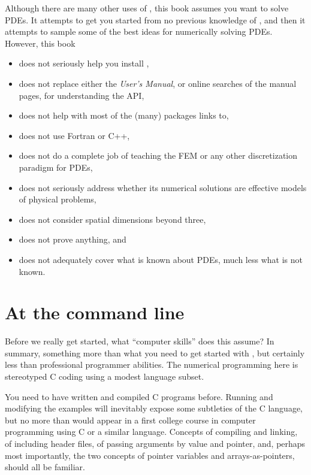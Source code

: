 Although there are many other uses of \PETSc, this book assumes you want to solve PDEs.  It attempts to get you started from no previous knowledge of \PETSc, and then it attempts to sample some of the best ideas for numerically solving PDEs.  However, this book\begin{itemize}
\item  does not seriously help you install \PETSc,
\item  does not replace either the \PETSc \emph{User's Manual}, or online searches of the \PETSc manual pages, for understanding the API,
\item  does not help with most of the (many) packages \PETSc links to,
\item  does not use Fortran or C++,
\item  does not do a complete job of teaching the FEM or any other discretization paradigm for PDEs,
\item  does not seriously address whether its numerical solutions are effective models of physical problems,
\item  does not consider spatial dimensions beyond three,
\item  does not prove anything, and
\item  does not adequately cover what is known about PDEs, much less what is not known.
\end{itemize}


\section{At the command line}

Before we really get started, what ``computer skills'' does this assume?  In summary, something more than what you need to get started with \Matlab, but certainly less than professional programmer abilities.  The numerical programming here is stereotyped C coding using a modest language subset.

You need to have written and compiled C programs before.   Running and modifying the examples will inevitably expose some subtleties of the C language, but no more than would appear in a first college course in computer programming using C or a similar language.  Concepts of compiling and linking, of including header files, of passing arguments by value and pointer, and, perhaps most importantly, the two concepts of pointer variables and arrays-as-pointers, should all be familiar.

